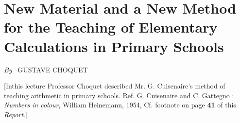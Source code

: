 \chapter[New Material and a New Method for the Teaching...]{New Material and a New Method for the Teaching of Elementary Calculations in Primary Schools}

\begin{center}
{\em By}~ GUSTAVE CHOQUET
\end{center}

\medskip

\setcounter{pageoriginal}{108}
[In\pageoriginale this lecture Professor Choquet described Mr. G. Cuisenaire's method of teaching arithmetic in primary schools. Ref. G. Cuisenaire and C. Gattegno : {\em Numbers in colour}, William Heinemann, 1954, Cf. footnote on page {\bf 41} of this {\em Report}.] 
